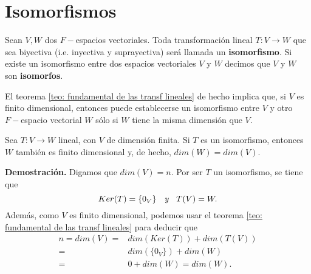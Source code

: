 \section{Isomorfismos}

\begin{defi}
Sean $V, W$ dos $F-$espacios vectoriales. Toda transformación
lineal $T: V \longrightarrow W$ que sea biyectiva 
(i.e. inyectiva y suprayectiva) será llamada
un \textbf{isomorfismo}. Si existe un isomorfismo
entre dos espacios vectoriales $V$ y $W$
decimos que $V$ y $W$ son \textbf{isomorfos}.
\end{defi}
El teorema \ref{teo: fundamental de las transf lineales}
de hecho implica que,
si $V$ es finito dimensional, entonces puede
establecerse un isomorfismo entre $V$
y otro $F-$espacio vectorial $W$ sólo si
$W$ tiene la misma dimensión que $V$.

\begin{prop}
	\label{prop: isomorfo implica misma dimension}
Sea $T: V \longrightarrow W$ lineal, con $V$
de dimensión finita. Si $T$ es un isomorfismo, entonces
$W$ también es finito dimensional y, de hecho,
$dim(W) = dim(V)$.
\end{prop}
\noindent
\textbf{Demostración.}
Digamos que $dim(V)=n$.
Por ser $T$ un isomorfismo, se tiene que
\[
Ker(T) = \{ 0_{V} \} \hspace{0.2cm} \textit{ y }
\hspace{0.2cm} T(V) = W.
\]
Además, como $V$ es finito dimensional, podemos usar el teorema
\ref{teo: fundamental de las transf lineales}
para deducir que
\begin{align*}
n = dim(V) = & dim(Ker(T)) + dim(T(V)) \\
= & dim(\{ 0_{V} \}) + dim(W) \\
= & 0 + dim(W) = dim(W).
\end{align*} 
\QEDB
\vspace{0.2cm}
 
